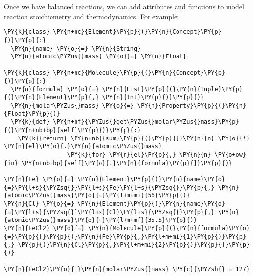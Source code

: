 \documentclass[letterpaper,compsoc,twoside]{IEEEtran}
\makeatletter
\def\PY@reset{\let\PY@it=\relax \let\PY@bf=\relax \let\PY@ul=\relax \let\PY@tc=\relax \let\PY@bc=\relax \let\PY@ff=\relax}
\def\PY@tok#1{\csname PY@tok@#1\endcsname}
\def\PY@toks#1+{\ifx\relax#1\empty\else \PY@tok{#1}\expandafter\PY@toks\fi}
\def\PY@do#1{\PY@bc{\PY@tc{\PY@ul{\PY@it{\PY@bf{\PY@ff{#1}}}}}}}
\def\PY#1#2{\PY@reset\PY@toks#1+\relax+\PY@do{#2}}
\def\PYZus{\char`\_}
\def\PYZsh{\char`\#}
\def\PYZsq{\char`\'}
\makeatother
\begin{document}
Once we have balanced reactions, we can add attributes and functions to model reaction stoichiometry and thermodynamics. For example:\begin{Verbatim}[commandchars=\\\{\},fontsize=\footnotesize]
\PY{k}{class} \PY{n+nc}{Element}\PY{p}{(}\PY{n}{Concept}\PY{p}{)}\PY{p}{:}
  \PY{n}{name} \PY{o}{=} \PY{n}{String}
  \PY{n}{atomic\PYZus{}mass} \PY{o}{=} \PY{n}{Float}

\PY{k}{class} \PY{n+nc}{Molecule}\PY{p}{(}\PY{n}{Concept}\PY{p}{)}\PY{p}{:}
  \PY{n}{formula} \PY{o}{=} \PY{n}{List}\PY{p}{(}\PY{n}{Tuple}\PY{p}{(}\PY{n}{Element}\PY{p}{,} \PY{n}{Int}\PY{p}{)}\PY{p}{)}
  \PY{n}{molar\PYZus{}mass} \PY{o}{=} \PY{n}{Property}\PY{p}{(}\PY{n}{Float}\PY{p}{)}
  \PY{k}{def} \PY{n+nf}{\PYZus{}get\PYZus{}molar\PYZus{}mass}\PY{p}{(}\PY{n+nb+bp}{self}\PY{p}{)}\PY{p}{:}
    \PY{k}{return} \PY{n+nb}{sum}\PY{p}{(}\PY{p}{[}\PY{n}{n} \PY{o}{*} \PY{n}{el}\PY{o}{.}\PY{n}{atomic\PYZus{}mass}
                  \PY{k}{for} \PY{n}{el}\PY{p}{,} \PY{n}{n} \PY{o+ow}{in} \PY{n+nb+bp}{self}\PY{o}{.}\PY{n}{formula}\PY{p}{]}\PY{p}{)}

\PY{n}{Fe} \PY{o}{=} \PY{n}{Element}\PY{p}{(}\PY{n}{name}\PY{o}{=}\PY{l+s}{\PYZsq{}}\PY{l+s}{Fe}\PY{l+s}{\PYZsq{}}\PY{p}{,} \PY{n}{atomic\PYZus{}mass}\PY{o}{=}\PY{l+m+mi}{56}\PY{p}{)}
\PY{n}{Cl} \PY{o}{=} \PY{n}{Element}\PY{p}{(}\PY{n}{name}\PY{o}{=}\PY{l+s}{\PYZsq{}}\PY{l+s}{Cl}\PY{l+s}{\PYZsq{}}\PY{p}{,} \PY{n}{atomic\PYZus{}mass}\PY{o}{=}\PY{l+m+mf}{35.5}\PY{p}{)}
\PY{n}{FeCl2} \PY{o}{=} \PY{n}{Molecule}\PY{p}{(}\PY{n}{formula}\PY{o}{=}\PY{p}{[}\PY{p}{(}\PY{n}{Fe}\PY{p}{,}\PY{l+m+mi}{1}\PY{p}{)}\PY{p}{,} \PY{p}{(}\PY{n}{Cl}\PY{p}{,}\PY{l+m+mi}{2}\PY{p}{)}\PY{p}{]}\PY{p}{)}

\PY{n}{FeCl2}\PY{o}{.}\PY{n}{molar\PYZus{}mass} \PY{c}{\PYZsh{} = 127}
\end{Verbatim}
\end{document}
